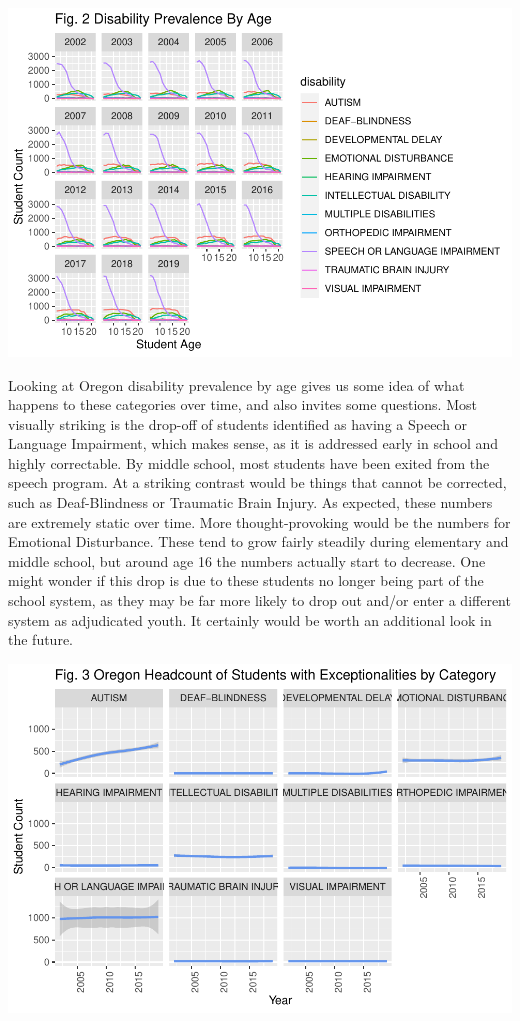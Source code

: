 \documentclass[
  english,
  man,floatsintext]{apa6}
\begin{document}
\includegraphics{Final_project_files/figure-latex/Oregon plot-1.pdf}

Looking at Oregon disability prevalence by age gives us some idea of what happens to these categories over time, and also invites some questions. Most visually striking is the drop-off of students identified as having a Speech or Language Impairment, which makes sense, as it is addressed early in school and highly correctable. By middle school, most students have been exited from the speech program. At a striking contrast would be things that cannot be corrected, such as Deaf-Blindness or Traumatic Brain Injury. As expected, these numbers are extremely static over time. More thought-provoking would be the numbers for Emotional Disturbance. These tend to grow fairly steadily during elementary and middle school, but around age 16 the numbers actually start to decrease. One might wonder if this drop is due to these students no longer being part of the school system, as they may be far more likely to drop out and/or enter a different system as adjudicated youth. It certainly would be worth an additional look in the future.

\includegraphics{Final_project_files/figure-latex/unnamed-chunk-1-1.pdf}
\end{document}
